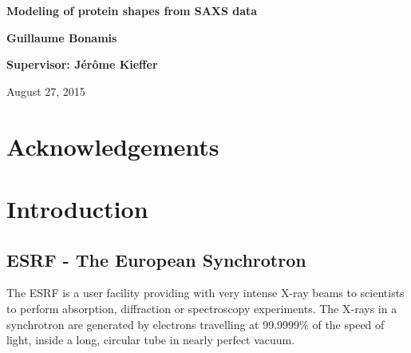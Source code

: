 \documentclass[a4paper, 11pt]{report}
\begin{document}
\begin{titlepage}
    \parindent=0pt
    \hrulefill
    \begin{center}\bfseries\Huge
        Modeling of protein shapes from SAXS data
    \end{center}

    \hrulefill
    \vspace*{1cm}
    \begin{center}\bfseries\Large           %
        Guillaume Bonamis
    \end{center}

    \begin{center}\bfseries\Large           %
        Supervisor: J\'er\^ome Kieffer
    \end{center}

    \begin{flushright}
        August 27, 2015
    \end{flushright}   
    
\end{titlepage}


\chapter*{Acknowledgements}


\tableofcontents
{}


\chapter{Introduction}

\section{ESRF - The European Synchrotron}

The ESRF is a user facility providing with very intense X-ray beams to 
scientists to perform absorption, diffraction or spectroscopy 
experiments. 
The X-rays in a synchrotron are generated by electrons travelling at 
99.9999\% of the speed of light, inside a long, circular tube in nearly 
perfect vacuum.\\
\end{document}
